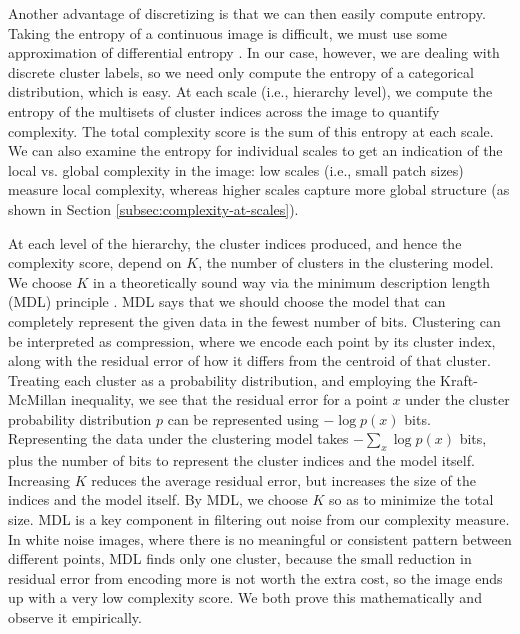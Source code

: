 \documentclass[a4paper,fleqn]{cas-sc}
\theoremstyle{remark}
\begin{document}
Another advantage of discretizing is that we can then easily compute entropy. Taking the entropy of a continuous image is difficult, we must use some approximation of differential entropy \citep{hulle2005edgeworth,pichler2022differential}. In our case, however, we are dealing with discrete cluster labels, so we need only compute the entropy of a categorical distribution, which is easy. At each scale (i.e., hierarchy level), we compute the entropy of the multisets of cluster indices across the image to quantify complexity. The total complexity score is the sum of this entropy at each scale. We can also examine the entropy for individual scales to get an indication of the local vs. global complexity in the image: low scales (i.e., small patch sizes) measure local complexity, whereas higher scales capture more global structure (as shown in Section \ref{subsec:complexity-at-scales}). %

At each level of the hierarchy, the cluster indices produced, and hence the complexity score, depend on $K$, the number of clusters in the clustering model. We choose $K$ in a theoretically sound way via the minimum description length (MDL) principle \citep{rissanen1983universal}. MDL says that we should choose the model that can completely represent the given data in the fewest number of bits. Clustering can be interpreted as compression, where we encode each point by its cluster index, along with the residual error of how it differs from the centroid of that cluster. Treating each cluster as a probability distribution, and employing the Kraft-McMillan inequality, we see that the residual error for a point $x$ under the cluster probability distribution $p$ can be represented using $-\log p(x)$ bits. Representing the data under the clustering model takes $-\sum_x\log p(x)$ bits, plus the number of bits to represent the cluster indices and the model itself. Increasing $K$ reduces the average residual error, but increases the size of the indices and the model itself. By MDL, we choose $K$ so as to minimize the total size. MDL is a key component in filtering out noise from our complexity measure. In white noise images, where there is no meaningful or consistent pattern between different points, MDL finds only one cluster, because the small reduction in residual error from encoding more is not worth the extra cost, so the image ends up with a very low complexity score. We both prove this mathematically and observe it empirically.
\end{document}
